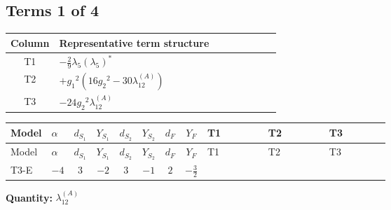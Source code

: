 \documentclass[8pt]{article}
\begin{document}
\begin{landscape}
\subsection*{Terms 1 of 4}
\begin{center}
\begin{tabular}{@{}c >{\raggedright\arraybackslash}p{0.82\linewidth}@{}}
\toprule
Column & Representative term structure \\
\midrule
T1 & \(\displaystyle -\frac{2}{9} {\lambda_5} \left({\lambda_5}\right)^{*}\) \\
\midrule
T2 & \(\displaystyle +{g_1}^2 \left(16 {g_2}^2-30 {\lambda_{12}^{(A)}}\right)\) \\
\midrule
T3 & \(\displaystyle -24 {g_2}^2 {\lambda_{12}^{(A)}}\) \\
\midrule
\bottomrule
\end{tabular}
\end{center}
\smallskip
\tiny
\begin{longtable}{@{}llcccccc >{\raggedright\arraybackslash}p{0.21\linewidth} >{\raggedright\arraybackslash}p{0.21\linewidth} >{\raggedright\arraybackslash}p{0.21\linewidth}@{}}
\toprule
Model & $\alpha$ & $d_{S_1}$ & $Y_{S_1}$ & $d_{S_2}$ & $Y_{S_2}$ & $d_F$ & $Y_F$ & T1 & T2 & T3 \\
\midrule
\endfirsthead
\toprule
Model & $\alpha$ & $d_{S_1}$ & $Y_{S_1}$ & $d_{S_2}$ & $Y_{S_2}$ & $d_F$ & $Y_F$ & T1 & T2 & T3 \\
\midrule
\endhead
T3-E & $-4$ & $3$ & $-2$ & $3$ & $-1$ & $2$ & $-\frac{3}{2}$ & \scriptsize\adjustbox{max width=\linewidth}{$\begin{gathered} -\frac{2}{9} {\lambda_5} \left({\lambda_5}\right)^{*}\end{gathered}$} & \scriptsize\adjustbox{max width=\linewidth}{$\begin{gathered} +{g_1}^2 \left(16 {g_2}^2-30 {\lambda_{12}^{(A)}}\right)\end{gathered}$} & \scriptsize\adjustbox{max width=\linewidth}{$\begin{gathered} -24 {g_2}^2 {\lambda_{12}^{(A)}}\end{gathered}$} \\
\midrule
\bottomrule
\end{longtable}
\clearpage
\noindent\textbf{Quantity: }$\lambda_{12}^{(A)}$\par\smallskip

\end{landscape}
\end{document}
